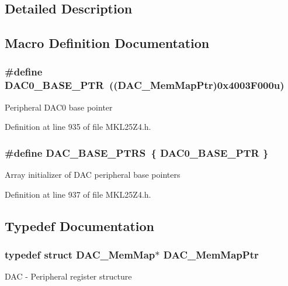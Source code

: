 \subsection{Detailed Description}


\subsection{Macro Definition Documentation}
\subsubsection[{\texorpdfstring{D\+A\+C0\+\_\+\+B\+A\+S\+E\+\_\+\+P\+TR}{DAC0_BASE_PTR}}]{\setlength{\rightskip}{0pt plus 5cm}\#define D\+A\+C0\+\_\+\+B\+A\+S\+E\+\_\+\+P\+TR~(({\bf D\+A\+C\+\_\+\+Mem\+Map\+Ptr})0x4003\+F000u)}\hypertarget{group___d_a_c___peripheral_gabe3b30df06ec04e5c899efd6e49f1800}{}\label{group___d_a_c___peripheral_gabe3b30df06ec04e5c899efd6e49f1800}
Peripheral D\+A\+C0 base pointer 

Definition at line 935 of file M\+K\+L25\+Z4.\+h.

\subsubsection[{\texorpdfstring{D\+A\+C\+\_\+\+B\+A\+S\+E\+\_\+\+P\+T\+RS}{DAC_BASE_PTRS}}]{\setlength{\rightskip}{0pt plus 5cm}\#define D\+A\+C\+\_\+\+B\+A\+S\+E\+\_\+\+P\+T\+RS~\{ {\bf D\+A\+C0\+\_\+\+B\+A\+S\+E\+\_\+\+P\+TR} \}}\hypertarget{group___d_a_c___peripheral_gab47690040e4d63adc4f324358c27157a}{}\label{group___d_a_c___peripheral_gab47690040e4d63adc4f324358c27157a}
Array initializer of D\+AC peripheral base pointers 

Definition at line 937 of file M\+K\+L25\+Z4.\+h.



\subsection{Typedef Documentation}
\subsubsection[{\texorpdfstring{D\+A\+C\+\_\+\+Mem\+Map\+Ptr}{DAC_MemMapPtr}}]{\setlength{\rightskip}{0pt plus 5cm}typedef struct {\bf D\+A\+C\+\_\+\+Mem\+Map}$\ast$ {\bf D\+A\+C\+\_\+\+Mem\+Map\+Ptr}}\hypertarget{group___d_a_c___peripheral_gaf4fffbe25ce148c577ec740897223a7f}{}\label{group___d_a_c___peripheral_gaf4fffbe25ce148c577ec740897223a7f}
D\+AC -\/ Peripheral register structure 